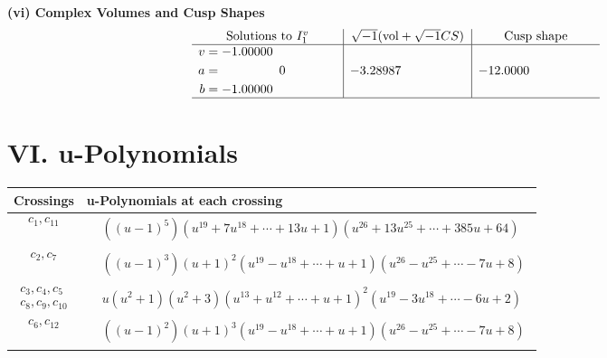 \documentclass[1p]{elsarticle_modified}
\theoremstyle{definition}
\newcommand{\I}{\sqrt{-1}}
\begin{document}
\newpage\flushleft \textbf{(vi) Complex Volumes and Cusp Shapes}
$$\begin{array}{c|c|c}  
\text{Solutions to }I^v_{1}& \I (\text{vol} + \sqrt{-1}CS) & \text{Cusp shape}\\
 \hline 
\begin{aligned}
v &= -1.00000\phantom{ +0.000000I} \\
a &= \phantom{-0.000000 } 0 \\
b &= -1.00000\phantom{ +0.000000I}\end{aligned}
 & -3.28987\phantom{ +0.000000I} & -12.0000\phantom{ +0.000000I}\\
 \hline 
 \end{array}$$\newpage
\newpage\renewcommand{\arraystretch}{1}
\centering \section*{ VI. u-Polynomials}
\begin{tabular}{m{50pt}|m{274pt}}
Crossings & \hspace{64pt}u-Polynomials at each crossing \\
\hline $$\begin{aligned}c_{1},c_{11}\end{aligned}$$&$\begin{aligned}
&((u-1)^5)(u^{19}+7 u^{18}+\cdots+13 u+1)(u^{26}+13 u^{25}+\cdots+385 u+64)
\end{aligned}$\\
\hline $$\begin{aligned}c_{2},c_{7}\end{aligned}$$&$\begin{aligned}
&((u-1)^3)(u+1)^2(u^{19}- u^{18}+\cdots+u+1)(u^{26}- u^{25}+\cdots-7 u+8)
\end{aligned}$\\
\hline $$\begin{aligned}c_{3},c_{4},c_{5}\\c_{8},c_{9},c_{10}\end{aligned}$$&$\begin{aligned}
&u(u^2+1)(u^2+3)(u^{13}+u^{12}+\cdots+u+1)^{2}(u^{19}-3 u^{18}+\cdots-6 u+2)
\end{aligned}$\\
\hline $$\begin{aligned}c_{6},c_{12}\end{aligned}$$&$\begin{aligned}
&((u-1)^2)(u+1)^3(u^{19}- u^{18}+\cdots+u+1)(u^{26}- u^{25}+\cdots-7 u+8)
\end{aligned}$\\
\hline
\end{tabular}\newpage\renewcommand{\arraystretch}{1}
\end{document}
